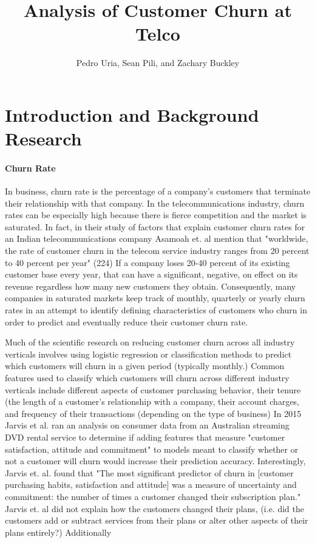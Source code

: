 \documentclass[man]{apa6}
\title{Analysis of Customer Churn at Telco}
\author{Pedro Uria, Sean Pili, and Zachary Buckley}
\affiliation{George Washington University}
\begin{document}
\maketitle

\section{Introduction and Background Research}
\paragraph{Churn Rate}

In business, churn rate is the percentage of a company's customers that terminate their relationship with that company. In the telecommunications industry, churn rates can be especially high because there is fierce competition and the market is saturated. In fact, in their study of factors that explain customer churn rates for an Indian telecommunications company  Asamoah et. al mention that "worldwide, the rate of customer churn in the telecom service industry ranges from 20 percent to 40 percent per year" (224) If a company loses 20-40 percent of its existing customer base every year, that can have a significant, negative, on effect on its revenue regardless how many new customers they obtain.  Consequently, many companies in saturated markets keep track of monthly, quarterly or yearly churn rates in an attempt to identify defining characteristics of customers who churn in order to predict and eventually reduce their customer churn rate. 

Much of the scientific research on reducing customer churn across all industry verticals involves using logistic regression or classification methods to predict which customers will churn in a given period (typically monthly.) Common features used to classify which customers will churn across different industry verticals include different aspects of customer purchasing behavior, their tenure (the length of a customer's relationship with a company, their account charges,  and frequency of their transactions (depending on the type of business)  In 2015 Jarvis et al. ran an analysis on consumer data from an Australian streaming DVD rental service to determine if adding features that measure "customer satisfaction, attitude and commitment" to models meant to classify whether or not a customer will churn would increase their prediction accuracy.  Interestingly, Jarvis et. al. found that "The most significant predictor of churn in [customer purchasing habits, satisfaction and attitude] was a measure of uncertainty and commitment: the number of times a customer changed their subscription plan." Jarvis et. al did not explain how the customers changed their plans, (i.e. did the customers add or subtract services from their plans or alter other aspects of their plans entirely?)  Additionally
\end{document}

